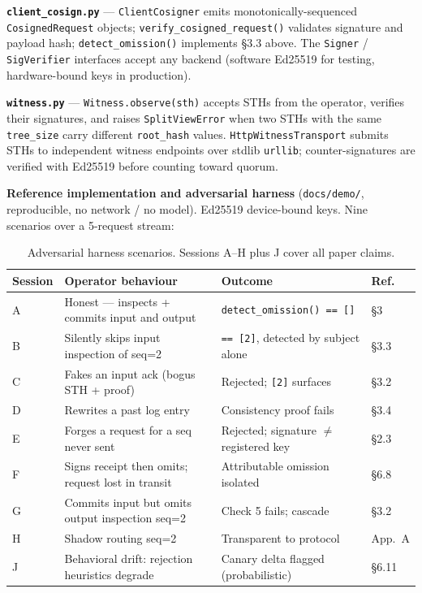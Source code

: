 \documentclass[11pt,a4paper]{article}
\newcommand{\code}[1]{\texttt{#1}}
\begin{document}
\textbf{\code{client\_cosign.py}} --- \code{ClientCosigner} emits monotonically-sequenced
\code{CosignedRequest} objects; \code{verify\_cosigned\_request()} validates signature
and payload hash; \code{detect\_omission()} implements \S3.3 above. The
\code{Signer} / \code{SigVerifier} interfaces accept any backend (software Ed25519 for
testing, hardware-bound keys in production).

\textbf{\code{witness.py}} --- \code{Witness.observe(sth)} accepts STHs from the
operator, verifies their signatures, and raises \code{SplitViewError} when two STHs with
the same \code{tree\_size} carry different \code{root\_hash} values.
\code{HttpWitnessTransport} submits STHs to independent witness endpoints over stdlib
\code{urllib}; counter-signatures are verified with Ed25519 before counting toward
quorum.

\textbf{Reference implementation and adversarial harness} (\code{docs/demo/},
reproducible, no network / no model). Ed25519 device-bound keys. Nine scenarios over a
5-request stream:

\begin{table}[h]
\centering
\small
\renewcommand{\arraystretch}{1.2}
\begin{tabular}{@{}lp{5.5cm}p{4cm}l@{}}
\toprule
\textbf{Session} & \textbf{Operator behaviour} & \textbf{Outcome} & \textbf{Ref.} \\
\midrule
A & Honest --- inspects + commits input and output & \code{detect\_omission() == []} & \S3 \\
B & Silently skips input inspection of seq=2 & \code{== [2]}, detected by subject alone & \S3.3 \\
C & Fakes an input ack (bogus STH + proof) & Rejected; \code{[2]} surfaces & \S3.2 \\
D & Rewrites a past log entry & Consistency proof fails & \S3.4 \\
E & Forges a request for a seq never sent & Rejected; signature $\neq$ registered key & \S2.3 \\
F & Signs receipt then omits; request lost in transit & Attributable omission isolated & \S6.8 \\
G & Commits input but omits output inspection seq=2 & Check 5 fails; cascade & \S3.2 \\
H & Shadow routing seq=2 & Transparent to protocol & App.~A \\
J & Behavioral drift: rejection heuristics degrade & Canary delta flagged (probabilistic) & \S6.11 \\
\bottomrule
\end{tabular}
\caption{Adversarial harness scenarios. Sessions A--H plus J cover all paper claims.}
\end{table}
\end{document}
